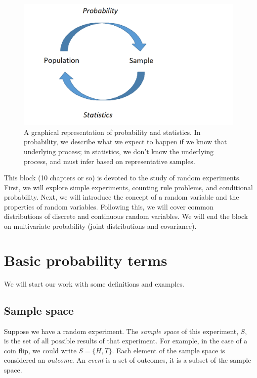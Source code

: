 \documentclass[
  letterpaper,
  DIV=11,
  numbers=noendperiod]{scrreprt}
\begin{document}
\begin{figure}[H]

{\centering \includegraphics{figures/Prob_Stats.png}

}

\caption{A graphical representation of probability and statistics. In
probability, we describe what we expect to happen if we know that
underlying process; in statistics, we don't know the underlying process,
and must infer based on representative samples.}

\end{figure}%

This block (10 chapters or so) is devoted to the study of random
experiments. First, we will explore simple experiments, counting rule
problems, and conditional probability. Next, we will introduce the
concept of a random variable and the properties of random variables.
Following this, we will cover common distributions of discrete and
continuous random variables. We will end the block on multivariate
probability (joint distributions and covariance).

\section{Basic probability terms}\label{basic-probability-terms}

We will start our work with some definitions and examples.

\subsection{Sample space}\label{sample-space}

Suppose we have a random experiment. The \emph{sample space} of this
experiment, \(S\), is the set of all possible results of that
experiment. For example, in the case of a coin flip, we could write
\(S=\{H,T\}\). Each element of the sample space is considered an
\emph{outcome}. An \emph{event} is a set of outcomes, it is a subset of
the sample space.
\end{document}
